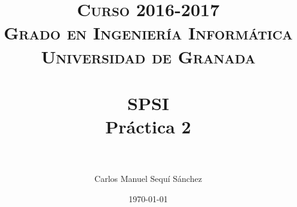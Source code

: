 


\title{	
\normalfont \normalsize 
\textsc{\textbf{Curso 2016-2017} \\ Grado en Ingeniería Informática \\ Universidad de Granada} \\ [25pt] %
\horrule{0.5pt} \\[0.4cm] %
\huge SPSI \\ Práctica 2 \\ %
\horrule{2pt} \\[0.5cm] %
}

\author{Carlos Manuel Sequí Sánchez} %

\date{\normalsize\today} %




\maketitle %

\newpage %

\tableofcontents %

\listoffigures

\listoftables

\newpage









